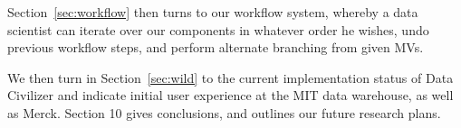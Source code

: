 Section~\ref{sec:workflow} then turns to our workflow system, whereby a data scientist can
iterate over our components in whatever order he wishes, undo previous workflow
steps, and perform alternate branching from given MVs. 

We then turn in Section~\ref{sec:wild} to the current implementation status of Data Civilizer
and indicate initial user experience at the MIT data warehouse, as well as
Merck.  Section 10 gives conclusions, and outlines our future research plans.

